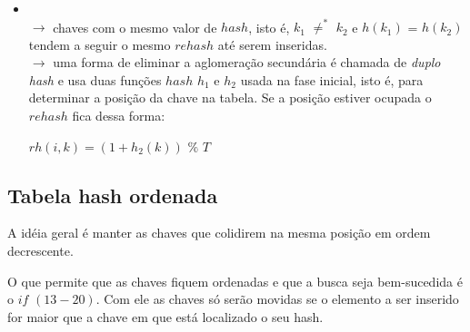 \documentclass[a4paper, 12pt]{article}
\begin{document}
\begin{itemize}
\begin{itemize}
\item {}\\
$\rightarrow$ chaves com o mesmo valor de $hash$, isto é, $k_{1}$ $\neq^*$ $k_{2}$ e $h(k_{1})$ = $h(k_{2})$ tendem a seguir o mesmo $rehash$ até serem inseridas.\\
$\rightarrow$ uma forma de eliminar a aglomeração secundária é chamada de \emph{duplo hash} e usa duas funções $hash$ $h_{1}$ e $h_{2}$ usada na fase inicial, isto é, para determinar a posição da chave na tabela. Se a posição estiver ocupada o $rehash$ fica dessa forma:
\begin{center}
$rh(i, k) = (1 + h_{2}(k))$ $\%$ $T$
\end{center}
\end{itemize}

\end{itemize}
\pagebreak

\subsection{Tabela hash ordenada}

A idéia geral é manter as chaves que colidirem na mesma posição em ordem decrescente.

\begin{algorithmic}[1]
\EndWhile
{}
	\color{BlueViolet}
		\color{black}
		\EndIf
	\color{BlueViolet}
	\EndIf
	\color{black}
	
\EndWhile
{}
\EndIf
{}
	\State {}
\Else
	\State {}
\EndIf

\end{algorithmic}

O que permite que as chaves fiquem ordenadas e que a busca seja bem-sucedida é o $if$ $(13-20)$. Com ele as chaves só serão movidas se o elemento a ser inserido for maior que a chave em que está localizado o seu hash.
\pagebreak
\end{document}

